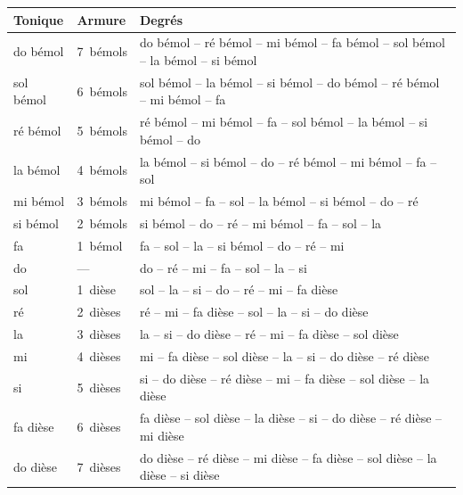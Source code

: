 
\begin{longtable}{@{}l l >{\raggedright\arraybackslash}p{12.6cm}@{}}
\toprule
\textbf{Tonique} & \textbf{Armure} & \textbf{Degrés} \\
\midrule
\endhead
do bémol & 7~bémols & do bémol -- ré bémol -- mi bémol -- fa bémol -- sol bémol -- la bémol -- si bémol \\
sol bémol & 6~bémols & sol bémol -- la bémol -- si bémol -- do bémol -- ré bémol -- mi bémol -- fa \\
ré bémol & 5~bémols & ré bémol -- mi bémol -- fa -- sol bémol -- la bémol -- si bémol -- do \\
la bémol & 4~bémols & la bémol -- si bémol -- do -- ré bémol -- mi bémol -- fa -- sol \\
mi bémol & 3~bémols & mi bémol -- fa -- sol -- la bémol -- si bémol -- do -- ré \\
si bémol & 2~bémols & si bémol -- do -- ré -- mi bémol -- fa -- sol -- la \\
fa & 1~bémol & fa -- sol -- la -- si bémol -- do -- ré -- mi \\
do & --- & do -- ré -- mi -- fa -- sol -- la -- si \\
sol & 1~dièse & sol -- la -- si -- do -- ré -- mi -- fa dièse \\
ré & 2~dièses & ré -- mi -- fa dièse -- sol -- la -- si -- do dièse \\
la & 3~dièses & la -- si -- do dièse -- ré -- mi -- fa dièse -- sol dièse \\
mi & 4~dièses & mi -- fa dièse -- sol dièse -- la -- si -- do dièse -- ré dièse \\
si & 5~dièses & si -- do dièse -- ré dièse -- mi -- fa dièse -- sol dièse -- la dièse \\
fa dièse & 6~dièses & fa dièse -- sol dièse -- la dièse -- si -- do dièse -- ré dièse -- mi dièse \\
do dièse & 7~dièses & do dièse -- ré dièse -- mi dièse -- fa dièse -- sol dièse -- la dièse -- si dièse \\
\bottomrule
\end{longtable}

